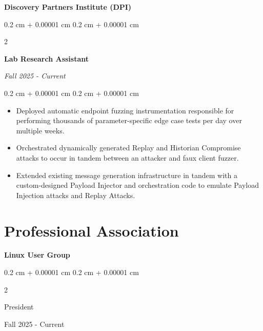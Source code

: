 \documentclass[10pt, letterpaper]{article}
\newenvironment{highlights}{
    \begin{itemize}[
        topsep=0.10 cm,
        parsep=0.10 cm,
        partopsep=0pt,
        itemsep=0pt,
        leftmargin=0.4 cm + 10pt
    ]
}{
    \end{itemize}
} %
\newenvironment{onecolentry}{
    \begin{adjustwidth}{
        0.2 cm + 0.00001 cm
    }{
        0.2 cm + 0.00001 cm
    }
}{
    \end{adjustwidth}
} %
\newenvironment{twocolentry}[2][]{
    \onecolentry
    \def\secondColumn{#2}
    \setcolumnwidth{\fill, 4.5 cm}
    \begin{paracol}{2}
}{
    \switchcolumn \raggedleft \secondColumn
    \end{paracol}
    \endonecolentry
} %
\begin{document}
\textbf{Discovery Partners Institute (DPI)}
\begin{twocolentry}{
    \textit{Fall 2025 - Current}
    }
    \textbf{Lab Research Assistant}
\end{twocolentry}
\begin{onecolentry}
    \begin{highlights}
      \item Deployed automatic endpoint fuzzing instrumentation responsible for performing thousands of parameter-specific edge case tests per day over multiple weeks. 
      \item Orchestrated dynamically generated Replay and Historian Compromise attacks to occur in tandem between an attacker and faux client fuzzer.
      \item Extended existing message generation infrastructure in tandem with a custom-designed Payload Injector and orchestration code to emulate Payload Injection attacks and Replay Attacks. 
    \end{highlights}
\end{onecolentry}


%
%
%
%
\section{Professional Association}
\textbf{Linux User Group}

\begin{twocolentry}{
    Fall 2025 - Current
    }

  President
\end{twocolentry}
\end{document}
